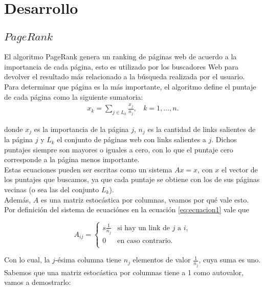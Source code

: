 \section{Desarrollo}

\subsection{$PageRank$}

El algoritmo PageRank genera un ranking de páginas web de acuerdo a la importancia de cada página, esto es utilizado por los buscadores Web para devolver el resultado más relacionado a la búsqueda realizada por el usuario.\\

Para determinar que página es la más importante, el algoritmo define el puntaje de cada página como la siguiente sumatoria:
\begin{eqnarray}
x_k = \sum_{j \in L_k} \frac{x_j}{n_j},~~~~k = 1,\dots,n.\label{eq:ecuacion1}
\end{eqnarray}

\noindent donde $x_{j}$ es la importancia de la página $j$, $n_{j}$ es la cantidad de links salientes de la página $j$ y $L_{k}$ el conjunto de páginas web con links salientes a $j$. Dichos puntajes siempre son mayores o iguales a cero, con lo que el puntaje cero corresponde a la página menos importante.\\


Estas ecuaciones pueden ser escritas como un sistema $Ax = x$, con $x$ el vector de los puntajes que buscamos, ya que cada puntaje se obtiene con los de sus páginas vecinas (o sea las del conjunto $L_{k}$).\\

Además, $A$ es una matriz estocástica por columnas, veamos por qué vale esto. Por definición del sistema de ecuaciónes en la ecuación \ref{eq:ecuacion1} vale que

\begin{equation*}
A_{ij} = \left\{
	\begin{array}{cl}s
	\frac{1}{n_{j}} & \text{si hay un link de } j \text{ a } i,\\
	0 & \text{en caso contrario.}\\
	\end{array} \right.
\end{equation*}

Con lo cual, la $j$-ésima columna tiene $n_{j}$ elementos de valor $\frac{1}{n_{j}}$, cuya suma es uno. Sabemos que una matriz estocástica por columnas tiene a 1 como autovalor, vamos a demostrarlo:\\


